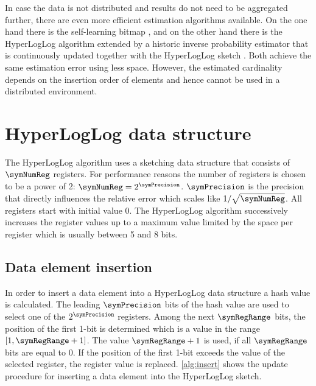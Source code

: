 \documentclass[a4paper]{scrartcl}
\begin{document}
In case the data is not distributed and results do not need to be aggregated further, there are even more efficient estimation algorithms available. On the one hand there is the self-learning bitmap \cite{Chen2011, Chen2015}, and on the other hand there is the HyperLogLog algorithm extended by a historic inverse probability estimator that is continuously updated together with the HyperLogLog sketch \cite{Ting2014}. Both achieve the same estimation error using less space. However, the estimated cardinality depends on the insertion order of elements and hence cannot be used in a distributed environment. 


\section{HyperLogLog data structure}
The HyperLogLog algorithm uses a sketching data structure that consists of $\symNumReg$ registers. For performance reasons the number of registers is chosen to be a power of 2: $\symNumReg = 2^\symPrecision$. $\symPrecision$ is the precision that directly influences the relative error which scales like $1/\sqrt{\symNumReg}$. All registers start with initial value 0. The HyperLogLog algorithm successively increases the register values up to a maximum value limited by the space per register which is usually between 5 and 8 bits. 

\subsection{Data element insertion}
\label{sec:data_element_insertion}
In order to insert a data element into a HyperLogLog data structure a hash value is calculated. The leading $\symPrecision$ bits of the hash value are used to select one of the $2^\symPrecision$ registers. Among the next $\symRegRange$ bits, the position of the first 1-bit is determined which is a value in the range $[1,\symRegRange+1]$. The value $\symRegRange+1$ is used, if all $\symRegRange$ bits are equal to 0. If the position of the first 1-bit exceeds the value of the selected register, the register value is replaced. \cref{alg:insert} shows the update procedure for inserting a data element into the HyperLogLog sketch.
\end{document}
